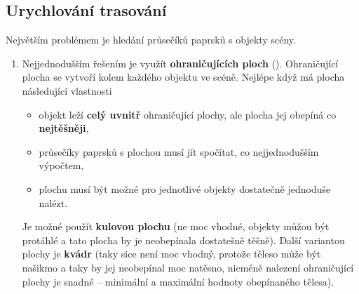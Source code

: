 \subsection{Urychlování trasování}
Největším problémem je hledání průsečíků paprsků s objekty scény.
\begin{enumerate}
\item Nejjednodušším řešením je využít \textbf{ohraničujících ploch} (). Ohraničující plocha se vytvoří kolem každého objektu ve scéně. Nejlépe když má plocha následující vlastnosti
\begin{itemize} 
	\item objekt leží \textbf{celý uvnitř} ohraničující plochy, ale plocha jej obepíná co \textbf{nejtěšněji},
	\item průsečíky paprsků s plochou musí jít spočítat, co nejjednodušším výpočtem,
	\item plochu musí být možné pro jednotlivé objekty dostatečně jednoduše nalézt.
\end{itemize}
Je možné použít \textbf{kulovou plochu} (ne moc vhodné, objekty můžou být protáhlé a tato plocha by je neobepínala dostatešně těšně). Další variantou plochy je \textbf{kvádr} (taky sice není moc vhodný, protože těleso může být našikmo a taky by jej neobepínal moc natěsno, nicméně nalezení ohraničující plochy je snadné -- minimální a maximální hodnoty obepínaného tělesa).


\end{enumerate}
